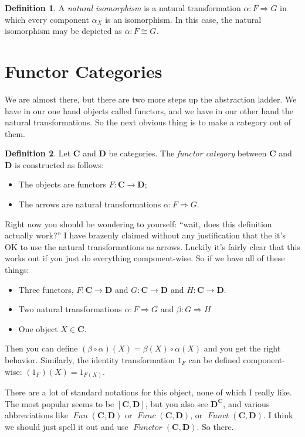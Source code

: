 \documentclass[12pt]{article}
\theoremstyle{definition}
\theoremstyle{definition}
\newtheorem{defn}{Definition}[]
\theoremstyle{definition}
\numberwithin{equation}{section}
\newcommand{\cat}[1]{\mathbf{#1}}      %
\newcommand{\CC}{\cat{C}}
\newcommand{\DD}{\cat{D}}
\DeclareMathOperator{\Fun}{\mathit{Functor}}
\newcommand{\iso}{\cong}                %
\newcommand{\fto}{\Rightarrow}
\def\ni{\goodbreak\noindent}
\begin{document}
\begin{defn}
A {\it natural isomorphism} is a natural transformation $\alpha: F \fto G$ in which every
component $\alpha_X$ is an isomorphism. In this case, the natural isomorphism may be
depicted as $\alpha: F \iso G$.
\end{defn}

\section{Functor Categories}

We are almost there, but there are two more steps up the abstraction ladder. We have in
our one hand objects called functors, and we have in our other hand the natural
transformations. So the next obvious thing is to make a category out of them.

\begin{defn}
 Let $\CC$ and $\DD$ be categories. The \emph{functor category} between $\CC$ and $\DD$ is
 constructed as follows:
 \begin{itemize}
  \item The objects are functors $F: \CC \to \DD$;
  \item The arrows are natural transformations $\alpha:F\fto G$.
 \end{itemize}
\end{defn}
\ni
Right now you should be wondering to yourself: ``wait, does this definition actually
work?'' I have brazenly claimed without any justification that the it's OK to use the
natural transformations as arrows. Luckily it's fairly clear that this works out if you
just do everything component-wise. So if we have all of these things: 
\begin{itemize}
\item Three functors, $F: \CC \to \DD$ and $G: \CC \to \DD$ and $H:\CC \to \DD$.

\item Two natural transformations $\alpha: F \fto G$ and $\beta: G \fto H$

\item One object $X \in \CC$.
\end{itemize}
\ni
Then you can define $(\beta \circ \alpha)(X) = \beta(X) \circ \alpha(X)$ and you get the
right behavior. Similarly, the identity transformation $1_F$ can be defined
component-wise: $(1_F)(X) = 1_{F(X)}$.

There are a lot of standard notations for this object, none of which I really like. The
most popular seems to be $[\CC, \DD]$, but you also see $\DD^{\CC}$, and various  
abbreviations like $\mathop{\mathit{Fun}}(\CC,\DD)$ or $\mathop{\mathit{Func}}(\CC,\DD)$,
or $\mathop{\mathit{Funct}}(\CC,\DD)$. I think we should just spell it out and use
$\Fun(\CC,\DD)$. So there.
\end{document}
